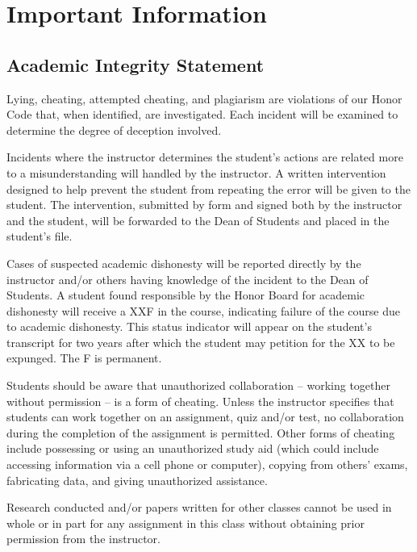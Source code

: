 \newpage

\section{Important Information}\label{important-information}

\subsection{Academic Integrity Statement}\label{cheating-or-plagiarism}

Lying, cheating, attempted cheating, and plagiarism are violations of our Honor Code that, when identified, are investigated. Each incident will be examined to determine the degree of deception involved.

\vspace{0.10in}
\noindent Incidents where the instructor determines the student’s actions are related more to a misunderstanding will handled by the instructor. A written intervention designed to help prevent the student from repeating the error will be given to the student. The intervention, submitted by form and signed both by the instructor and the student, will be forwarded to the Dean of Students and placed in the student’s file.

\vspace{0.10in}
\noindent Cases of suspected academic dishonesty will be reported directly by the instructor and/or others having knowledge of the incident to the Dean of Students. A student found responsible by the Honor Board for academic dishonesty will receive a XXF in the course, indicating failure of the course due to academic dishonesty. This status indicator will appear on the student’s transcript for two years after which the student may petition for the XX to be expunged. The F is permanent. 

\vspace{0.10in}
\noindent Students should be aware that unauthorized collaboration -- working together without permission -- is a form of cheating. Unless the instructor specifies that students can work together on an assignment, quiz and/or test, no collaboration during the completion of the assignment is permitted. Other forms of cheating include possessing or using an unauthorized study aid (which could include accessing information via a cell phone or computer), copying from others’ exams, fabricating data, and giving unauthorized assistance.

\vspace{0.10in}
\noindent Research conducted and/or papers written for other classes cannot be used in whole or in part for any assignment in this class without obtaining prior permission from the instructor.

